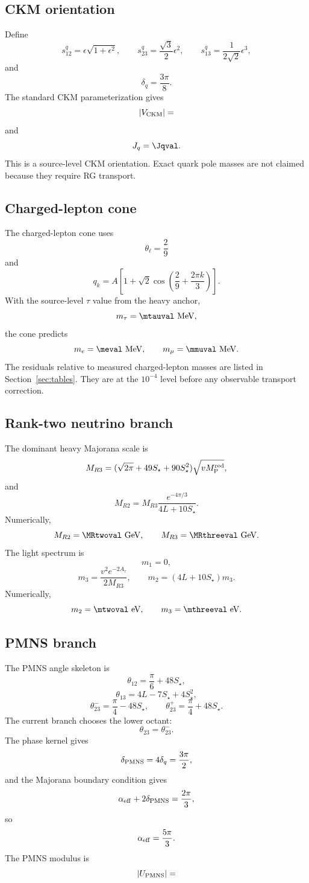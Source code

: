\documentclass[11pt]{article}
\newcommand{\Mred}{M_{\rm P}^{\rm red}}
\begin{document}
\subsection{CKM orientation}

Define
\[
s_{12}^q=\epsilon\sqrt{1+\epsilon^2},\qquad
s_{23}^q=\frac{\sqrt3}{2}\epsilon^2,\qquad
s_{13}^q=\frac{1}{2\sqrt2}\epsilon^3,
\]
and
\[
\delta_q=\frac{3\pi}{8}.
\]
The standard CKM parameterization gives
\[
|V_{\rm CKM}|=

\]
and
\[
J_q=\Jqval.
\]
This is a source-level CKM orientation. Exact quark pole masses are not claimed because they require RG transport.

\subsection{Charged-lepton cone}

The charged-lepton cone uses
\[
\theta_\ell=\frac29
\]
and
\[
q_k=A\left[
1+\sqrt2\cos\left(\frac29+\frac{2\pi k}{3}\right)
\right].
\]
With the source-level \(\tau\) value from the heavy anchor,
\[
m_\tau=\mtauval\ {\rm MeV},
\]
the cone predicts
\[
m_e=\meval\ {\rm MeV},\qquad
m_\mu=\mmuval\ {\rm MeV}.
\]
The residuals relative to measured charged-lepton masses are listed in Section~\ref{sec:tables}. They are at the \(10^{-4}\) level before any observable transport correction.

\subsection{Rank-two neutrino branch}

The dominant heavy Majorana scale is
\[
M_{R3}
=
(\sqrt{2\pi}+49S_\star+90S_\star^2)\sqrt{v\Mred},
\]
and
\[
M_{R2}
=
M_{R3}\frac{e^{-4\pi/3}}{4L+10S_\star}.
\]
Numerically,
\[
M_{R2}=\MRtwoval\ {\rm GeV},\qquad
M_{R3}=\MRthreeval\ {\rm GeV}.
\]
The light spectrum is
\[
m_1=0,
\]
\[
m_3=\frac{v^2e^{-2A_\tau}}{2M_{R3}},
\qquad
m_2=(4L+10S_\star)m_3.
\]
Numerically,
\[
m_2=\mtwoval\ {\rm eV},\qquad
m_3=\mthreeval\ {\rm eV}.
\]

\subsection{PMNS branch}

The PMNS angle skeleton is
\[
\theta_{12}=\frac\pi6+48S_\star,
\]
\[
\theta_{13}=4L-7S_\star+4S_\star^2,
\]
\[
\theta_{23}^{-}=\frac\pi4-48S_\star,\qquad
\theta_{23}^{+}=\frac\pi4+48S_\star.
\]
The current branch chooses the lower octant:
\[
\theta_{23}=\theta_{23}^{-}.
\]
The phase kernel gives
\[
\delta_{\rm PMNS}=4\delta_q=\frac{3\pi}{2},
\]
and the Majorana boundary condition gives
\[
\alpha_{\rm eff}+2\delta_{\rm PMNS}=\frac{2\pi}{3},
\]
so
\[
\alpha_{\rm eff}=\frac{5\pi}{3}.
\]
The PMNS modulus is
\[
|U_{\rm PMNS}|=

\]
\end{document}
